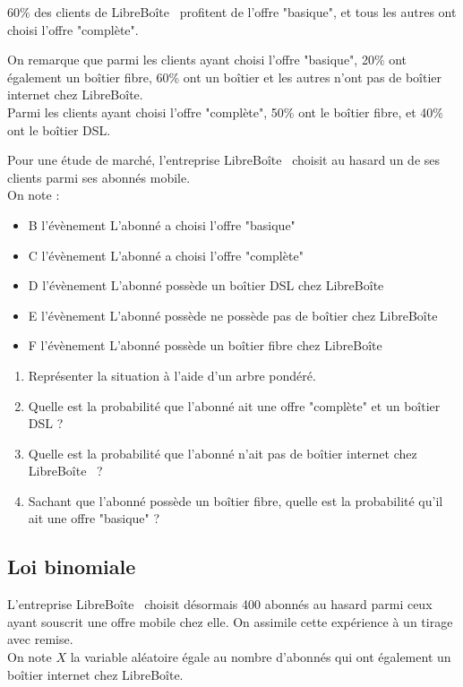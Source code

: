 \documentclass[oneside,12pt]{article}
\begin{document}
60\% des clients de LibreBoîte\texttrademark~ profitent de l'offre "basique", et tous les autres ont choisi l'offre "complète".

On remarque que parmi les clients ayant choisi l'offre "basique", 20\% ont également un boîtier fibre, 60\% ont un boîtier et les autres n'ont pas de boîtier internet chez LibreBoîte\texttrademark.\\
Parmi les clients ayant choisi l'offre "complète", 50\% ont le boîtier fibre, et 40\% ont le boîtier DSL.

Pour une étude de marché, l'entreprise LibreBoîte\texttrademark~ choisit au hasard un de ses clients parmi ses abonnés mobile.\\[5pt]
On note : 
\begin{itemize}
    \item B l'évènement \og L'abonné a choisi l'offre "basique"\fg
    \item C l'évènement \og L'abonné a choisi l'offre "complète"\fg
    \item D l'évènement \og L'abonné possède un boîtier DSL chez LibreBoîte\texttrademark\fg
    \item E l'évènement \og L'abonné possède ne possède pas de boîtier chez LibreBoîte\texttrademark\fg
    \item F l'évènement \og L'abonné possède un boîtier fibre chez LibreBoîte\texttrademark\fg
\end{itemize}

\begin{enumerate}
    \item Représenter la situation à l'aide d'un arbre pondéré.
    \item Quelle est la probabilité que l'abonné ait une offre "complète" et un boîtier DSL ?
    \item Quelle est la probabilité que l'abonné n'ait pas de boîtier internet chez LibreBoîte\texttrademark~ ?
    \item Sachant que l'abonné possède un boîtier fibre, quelle est la probabilité qu'il ait une offre "basique" ?
\end{enumerate}


\subsection{Loi binomiale}
L'entreprise LibreBoîte\texttrademark~ choisit désormais 400 abonnés au hasard parmi ceux ayant souscrit une offre mobile chez elle. On assimile cette expérience à un tirage avec remise.\\[5pt]
On note $X$ la variable aléatoire égale au nombre d'abonnés qui ont également un boîtier internet chez LibreBoîte\texttrademark.
\end{document}
